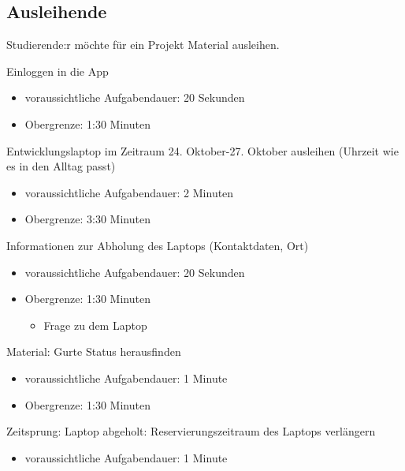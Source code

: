 \subsection{Ausleihende}

{\sffamily\color{maincolor}{Szenario:}} Studierende:r möchte für ein Projekt Material ausleihen.
\begin{compactenum}
    \item Einloggen in die App
            \begin{itemize}
                \item voraussichtliche Aufgabendauer: 20 Sekunden
                \item Obergrenze: 1:30 Minuten
            \end{itemize}
    \item Entwicklungslaptop im Zeitraum 24. Oktober-27. Oktober ausleihen (Uhrzeit wie es in den Alltag passt)
            \begin{itemize}
                \item voraussichtliche Aufgabendauer: 2 Minuten
                \item Obergrenze: 3:30 Minuten
            \end{itemize}
    \item Informationen zur Abholung des Laptops (Kontaktdaten, Ort)
            \begin{itemize}
                \item voraussichtliche Aufgabendauer: 20 Sekunden
                \item Obergrenze: 1:30 Minuten
                \begin{itemize}
                    \item Frage zu dem Laptop
                \end{itemize}
            \end{itemize}
    \item Material: Gurte Status herausfinden
            \begin{itemize}
                \item voraussichtliche Aufgabendauer: 1 Minute
                \item Obergrenze: 1:30 Minuten
            \end{itemize}
    \item Zeitsprung: Laptop abgeholt: Reservierungszeitraum des Laptops verlängern
            \begin{itemize}
                \item voraussichtliche Aufgabendauer: 1 Minute

\end{itemize}
\end{compactenum}
